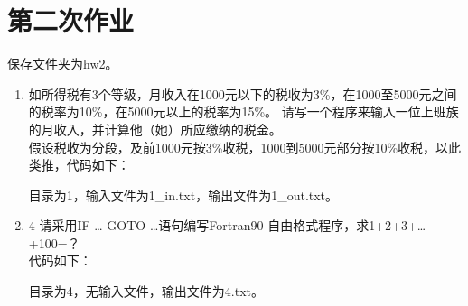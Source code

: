 \documentclass{ctexart}
\begin{document}
\section{第二次作业}

    保存文件夹为hw2。
    
    \begin{enumerate}

        \item
            如所得税有3个等级，月收入在1000元以下的税收为3\%，在1000至5000元之间的税率为10\%，在5000元以上的税率为15\%。
            请写一个程序来输入一位上班族的月收入，并计算他（她）所应缴纳的税金。\\

            假设税收为分段，及前1000元按3\%收税，1000到5000元部分按10\%收税，以此类推，代码如下：

            目录为1，输入文件为1\_in.txt，输出文件为1\_out.txt。

        \item{4}
            请采用IF … GOTO …语句编写Fortran90 自由格式程序，求1+2+3+…+100=？\\

            代码如下：

            目录为4，无输入文件，输出文件为4.txt。

    \end{enumerate}
\end{document}
